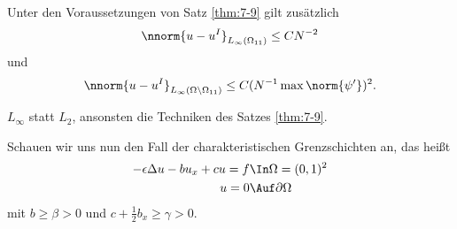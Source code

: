 \begin{lemma}\label{lem:7-10}
  Unter den Voraussetzungen von Satz \ref{thm:7-9} gilt zusätzlich
  \begin{align*}
    \nnorm{u - u^{I}}_{L_{\infty}(\Omega_{11})} \leq C N^{-2}
  \end{align*}
und
\begin{align*}
    \nnorm{u - u^{I}}_{L_{\infty}(\Omega\setminus\Omega_{11})} \leq C (N^{-1} \max\norm{\psi'})^{2}. 
\end{align*}
\end{lemma}
\begin{beweis}
  $L_{\infty}$ statt $L_{2}$, ansonsten die Techniken des Satzes \ref{thm:7-9}. 
\end{beweis}

Schauen wir uns nun den Fall der charakteristischen Grenzschichten an, das heißt
\begin{align*}
  - \epsilon \Delta u - b u_{x} + cu = f &\In \Omega = (0, 1)^{2} \\
u = 0& \Auf \partial \Omega 
\end{align*}
mit $b \geq \beta > 0$ und $ c + \frac 12 b_{x} \geq \gamma> 0$. 

